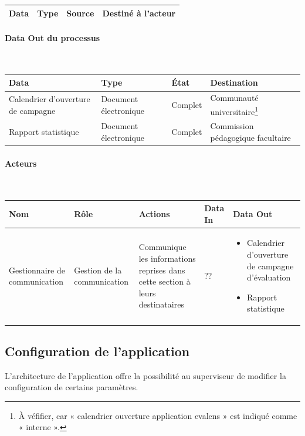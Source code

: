 \documentclass[a4paper,11pt]{report}
\begin{document}
\begin{tabularx}{\linewidth}{|X|X|X|X|} \hline
Data & Type & Source & Destiné à l'acteur \\ \hline

\end{tabularx}

\paragraph{Data Out du processus}~\newline{}

\begin{tabularx}{\linewidth}{|X|X|X|X|} \hline
Data & Type & État & Destination \\ \hline
Calendrier d'ouverture de campagne & Document électronique & Complet & Communauté universitaire\footnote{À véfifier, car « calendrier ouverture application evalens » est indiqué comme « interne ».} \\
Rapport statistique & Document électronique & Complet & Commission pédagogique facultaire \\ \hline
\end{tabularx}

\paragraph{Acteurs}~\newline{}

\begin{tabularx}{\linewidth}{|X|X|X|X|X|} \hline
Nom & Rôle & Actions & Data In & Data Out \\ \hline 
Gestionnaire de communication & Gestion de la communication & Communique les informations reprises dans cette section à leurs destinataires & ?? & 
	\begin{itemize} 
		\item Calendrier d'ouverture de campagne d'évaluation
		\item Rapport statistique
	\end{itemize}
\\ \hline
\end{tabularx}





\subsection{Configuration de l'application}
L'architecture de l'application offre la possibilité au superviseur de modifier la configuration de certains paramètres.
\end{document}
